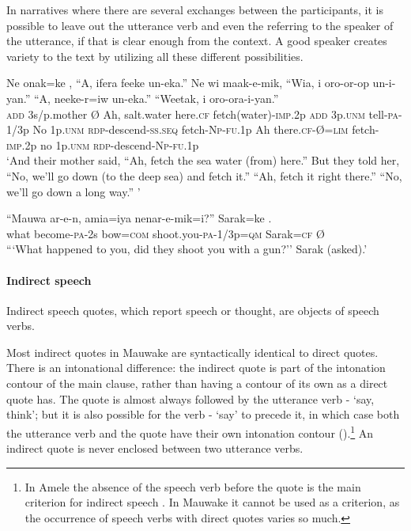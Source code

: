 In narratives where there are several exchanges between the participants, it is possible to leave out the utterance verb and even the  referring to the speaker of the utterance, if that is clear enough from the context. A good speaker creates variety to the text by utilizing all these different possibilities. 

\ea%
\label{ex:x1581}
\gll Ne  onak=ke  \textstyleEmphasizedVernacularWords{{\O}},  ``A,  ifera  feeke  un-eka.'' Ne  wi  maak-e-mik,  ``Wia,  i  oro-or-op un-i-yan.''  ``A,  neeke-r=iw  un-eka.''  ``Weetak, i  oro-ora-i-yan.''\\
\textsc{add} 3s/p.mother  {\O}  Ah,  salt.water  here.\textsc{cf} fetch(water)-\textsc{imp}.2p \textsc{add} 3p.\textsc{unm} tell-\textsc{pa}-1/3p No  1p.\textsc{unm} \textsc{rdp}-descend-\textsc{ss}.\textsc{seq} fetch-\textsc{Np}-\textsc{fu}.1p Ah there.\textsc{cf}-{\O}=\textsc{lim} fetch-\textsc{imp}.2p no 1p.\textsc{unm} \textsc{rdp}-descend-\textsc{Np}-\textsc{fu}.1p\\
\glt`And their mother said, ``Ah, fetch the sea water (from) here.'' But they told her, ``No, we'll go down (to the deep sea) and fetch it.'' ``Ah, fetch it right there.'' ``No, we'll go down a long way.'' '
\z


\ea%
\label{ex:x1582}
\gll ``Mauwa ar-e-n, amia=iya nenar-e-mik=i?'' Sarak=ke \textstyleEmphasizedVernacularWords{{\O}}.\hspace{-1mm}\\
what become-\textsc{pa}-2s bow=\textsc{com} shoot.you-\textsc{pa}-1/3p=\textsc{qm} Sarak=\textsc{cf} {\O}\\
\glt```What happened to you, did they shoot you with a gun?'' Sarak (asked).'
\z


\paragraph[Indirect speech]{Indirect speech}

Indirect speech quotes, which report speech or thought, are objects of speech verbs. 

Most indirect quotes in Mauwake are syntactically identical to direct quotes. There is an intonational difference: the indirect quote is part of the intonation contour of the main clause, rather than having a contour of its own as a direct quote has. The quote is almost always followed by the utterance verb - `say, think'; but it is also possible for the verb - `say' to precede it, in which case both the utterance verb and the quote have their own intonation contour ().\footnote{In Amele the absence of the speech verb before the quote is the main criterion for indirect speech \citep[14]{Roberts1987}. In Mauwake it cannot be used as a criterion, as the occurrence of speech verbs with direct quotes varies so much.} An indirect quote is never enclosed between two utterance verbs. 


